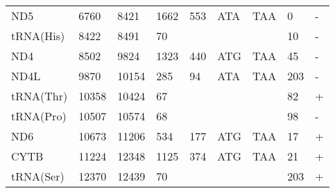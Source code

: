 \documentclass[../DISSERTACAO_MAIN.tex]{subfiles}
\begin{document}
\begin{longtable}{llllllllllllllllllllll}
			ND5          & 6760           & \multicolumn{2}{l}{8421}  & \multicolumn{2}{l}{1662}       & \multicolumn{3}{l}{553}                       & \multicolumn{3}{l}{ATA}           & \multicolumn{3}{l}{TAA}   & \multicolumn{3}{l}{0}           & \multicolumn{4}{l}{-}                  \\
			tRNA(His)    & 8422           & \multicolumn{2}{l}{8491}  & \multicolumn{2}{l}{70}         & \multicolumn{3}{l}{}                          & \multicolumn{3}{l}{}              & \multicolumn{3}{l}{}      & \multicolumn{3}{l}{10}          & \multicolumn{4}{l}{-}                  \\
			ND4          & 8502           & \multicolumn{2}{l}{9824}  & \multicolumn{2}{l}{1323}       & \multicolumn{3}{l}{440}                       & \multicolumn{3}{l}{ATG}           & \multicolumn{3}{l}{TAA}   & \multicolumn{3}{l}{45}          & \multicolumn{4}{l}{-}                  \\
			ND4L         & 9870           & \multicolumn{2}{l}{10154} & \multicolumn{2}{l}{285}        & \multicolumn{3}{l}{94}                        & \multicolumn{3}{l}{ATA}           & \multicolumn{3}{l}{TAA}   & \multicolumn{3}{l}{203}         & \multicolumn{4}{l}{-}                  \\
			tRNA(Thr)    & 10358          & \multicolumn{2}{l}{10424} & \multicolumn{2}{l}{67}         & \multicolumn{3}{l}{}                          & \multicolumn{3}{l}{}              & \multicolumn{3}{l}{}      & \multicolumn{3}{l}{82}          & \multicolumn{4}{l}{+}                  \\
			tRNA(Pro)    & 10507          & \multicolumn{2}{l}{10574} & \multicolumn{2}{l}{68}         & \multicolumn{3}{l}{}                          & \multicolumn{3}{l}{}              & \multicolumn{3}{l}{}      & \multicolumn{3}{l}{98}          & \multicolumn{4}{l}{-}                  \\
			ND6          & 10673          & \multicolumn{2}{l}{11206} & \multicolumn{2}{l}{534}        & \multicolumn{3}{l}{177}                       & \multicolumn{3}{l}{ATG}           & \multicolumn{3}{l}{TAA}   & \multicolumn{3}{l}{17}          & \multicolumn{4}{l}{+}                  \\
			CYTB         & 11224          & \multicolumn{2}{l}{12348} & \multicolumn{2}{l}{1125}       & \multicolumn{3}{l}{374}                       & \multicolumn{3}{l}{ATG}           & \multicolumn{3}{l}{TAA}   & \multicolumn{3}{l}{21}          & \multicolumn{4}{l}{+}                  \\
			tRNA(Ser)    & 12370          & \multicolumn{2}{l}{12439} & \multicolumn{2}{l}{70}         & \multicolumn{3}{l}{}                          & \multicolumn{3}{l}{}              & \multicolumn{3}{l}{}      & \multicolumn{3}{l}{203}         & \multicolumn{4}{l}{+}                  \\

\end{longtable}
\end{document}
